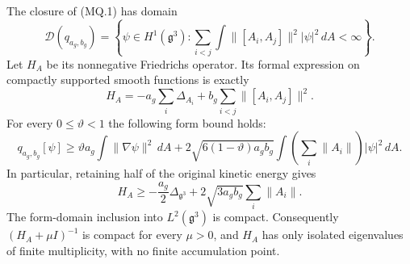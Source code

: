 \begin{theorem}
\label{qh:matrix-compact}
The closure of (MQ.1) has domain
\[
 \mathcal D(q_{a_g,b_g})=
 \left\{\psi\in H^1(\mathfrak g^3):
  \sum_{i<j}\int\|[A_i,A_j]\|^2|\psi|^2\,dA<\infty\right\}.    \tag{MQ.5}
\]
Let $H_A$ be its nonnegative Friedrichs operator. Its formal expression
on compactly supported smooth functions is exactly
\[
 H_A=-a_g\sum_i\Delta_{A_i}
                 +b_g\sum_{i<j}\|[A_i,A_j]\|^2.                \tag{MQ.6}
\]
For every $0\leq\vartheta<1$ the following form bound holds:
\[
 q_{a_g,b_g}[\psi]\geq
 \vartheta a_g\int\|\nabla\psi\|^2\,dA+
 2\sqrt{6(1-\vartheta)a_gb_g}
       \int\left(\sum_i\|A_i\|\right)|\psi|^2\,dA.             \tag{MQ.7}
\]
In particular, retaining half of the original kinetic energy gives
\[
 H_A\geq-\frac{a_g}{2}\Delta_{\mathfrak g^3}
                 +2\sqrt{3a_gb_g}\sum_i\|A_i\|.             \tag{MQ.8}
\]
The form-domain inclusion into $L^2(\mathfrak g^3)$ is compact.
Consequently $(H_A+\mu I)^{-1}$ is compact for every $\mu>0$,
and $H_A$ has only isolated eigenvalues of finite multiplicity,
with no finite accumulation point.
\end{theorem}
